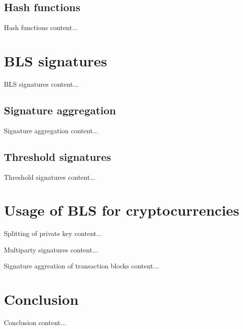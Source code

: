 \documentclass{beamer}
\begin{document}
\subsection{Hash functions}
\begin{frame}{Hash functions}
	content...
\end{frame}
\section{BLS signatures}
\begin{frame}{BLS signatures}
	content...
\end{frame}
\subsection{Signature aggregation}
\begin{frame}{Signature aggregation}
	content...
\end{frame}
\subsection{Threshold signatures}
\begin{frame}{Threshold signatures}
	content...
\end{frame}
\section{Usage of BLS for cryptocurrencies}
\begin{frame}{Splitting of private key}
	content...
\end{frame}
\begin{frame}{Multiparty signatures}
	content...
\end{frame}
\begin{frame}{Signature aggreation of transaction blocks}
	content...
\end{frame}
\section{Conclusion}
\begin{frame}{Conclusion}
	content...
\end{frame}
\end{document}
